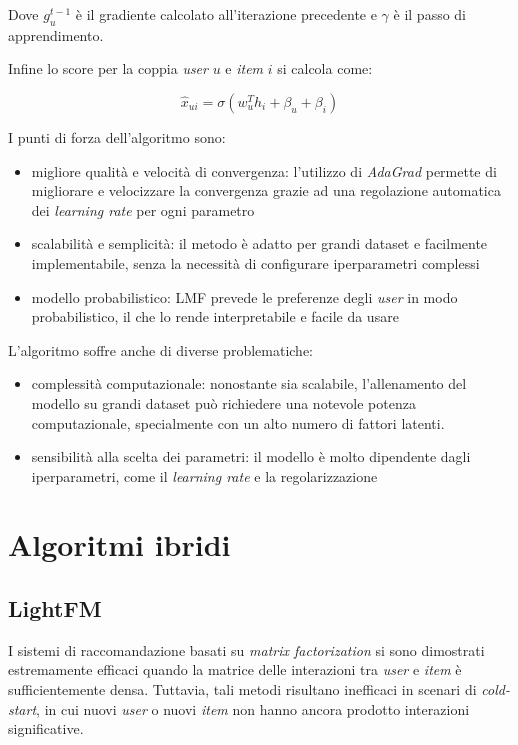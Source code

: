 Dove $g_u^{t-1}$ è il gradiente calcolato all'iterazione precedente e $\gamma$ è il passo di apprendimento.

Infine lo score per la coppia \textit{user} $u$ e \textit{item} $i$ si calcola come:

\[
\hat{x}_{ui} = \sigma(w_u^T h_i + \beta_u + \beta_i)
\]

I punti di forza dell'algoritmo sono:

\begin{itemize}
    \item migliore qualità e velocità di convergenza: l'utilizzo di \textit{AdaGrad} permette di migliorare e velocizzare la convergenza grazie ad una regolazione automatica dei \textit{learning rate} per ogni parametro
    \item scalabilità e semplicità: il metodo è adatto per grandi dataset e facilmente implementabile, senza la necessità di configurare iperparametri complessi
    \item modello probabilistico: LMF prevede le preferenze degli \textit{user} in modo probabilistico, il che lo rende interpretabile e facile da usare
\end{itemize}

L'algoritmo soffre anche di diverse problematiche:

\begin{itemize}
    \item complessità computazionale: nonostante sia scalabile, l'allenamento del modello su grandi dataset può richiedere una notevole potenza computazionale, specialmente con un alto numero di fattori latenti.
    \item sensibilità alla scelta dei parametri: il modello è molto dipendente dagli iperparametri, come il \textit{learning rate} e la regolarizzazione
\end{itemize}

\section{Algoritmi ibridi}\label{algoritmi-ibridi}

\subsection{LightFM}\label{lightfm}

I sistemi di raccomandazione basati su \textit{matrix factorization} si sono dimostrati estremamente efficaci quando la matrice delle interazioni tra \textit{user} e \textit{item} è sufficientemente densa. Tuttavia, tali metodi risultano inefficaci in scenari di \textit{cold-start}, in cui nuovi \textit{user} o nuovi \textit{item} non hanno ancora prodotto interazioni significative.

